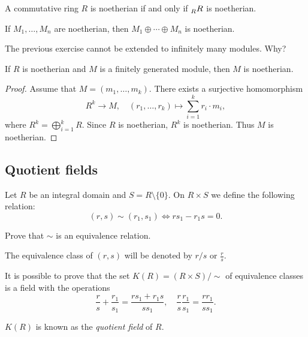 \begin{exercise}
\label{xca:regular_noetheriano}
A commutative ring $R$ is noetherian if and only if $\prescript{}{R}R$ is noetherian.	
\end{exercise}

\begin{exercise}
\label{xca:directa_noetheriano}
If $M_1,\dots,M_n$ are noetherian, then $M_1\oplus\cdots\oplus M_n$ is noetherian. 	
\end{exercise}

The previous exercise cannot be extended to infinitely many modules. Why?

\begin{proposition}
If $R$ is noetherian and $M$ is a finitely generated module, then $M$ is noetherian. 
\end{proposition}

\begin{proof}
    Assume that $M=(m_1,\dots,m_k)$. There exists a surjective homomorphism  
\[
R^k\to M,\quad (r_1,\dots,r_k)\mapsto \sum_{i=1}^k r_i\cdot m_i,
\]
where
$R^k=\bigoplus_{i=1}^k R$. Since $R$ is noetherian, $R^k$ is noetherian. Thus $M$ is noetherian.	
\end{proof}

\subsection{Quotient fields}

Let $R$ be an integral domain and $S=R\setminus\{0\}$. 
On $R\times S$ we define the following relation:
\[
(r,s)\sim (r_1,s_1)\Longleftrightarrow rs_1-r_1s=0.
\]

\begin{exercise}
Prove that $\sim$ is an equivalence relation.
\end{exercise}

The equivalence class of $(r,s)$ will be denoted by $r/s$ or $\frac{r}{s}$. 

It is possible to prove that the set 
$K(R)=(R\times S)/{\sim}$ of equivalence classes is a field 
with the operations 
\begin{equation}
\label{eq:K(R)}
\frac{r}{s}+\frac{r_1}{s_1}=\frac{rs_1+r_1s}{ss_1},
\quad
\frac{r}{s}\frac{r_1}{s_1}=\frac{rr_1}{ss_1}.
\end{equation}

\begin{definition}
$K(R)$ is known as the \emph{quotient field} of $R$. 
\end{definition}

